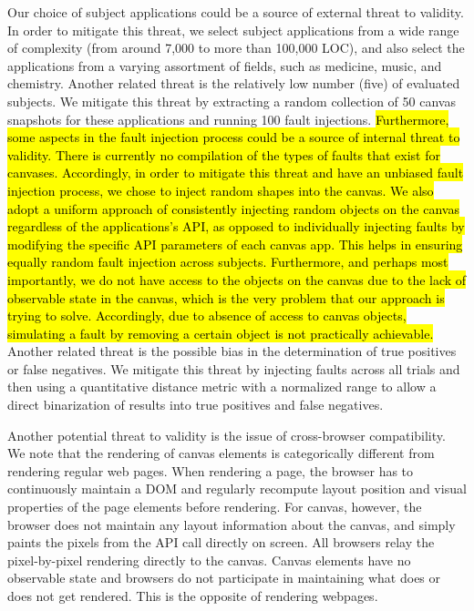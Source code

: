 Our choice of subject applications could be a source of external threat to validity. In order to mitigate this threat, we select subject applications from a wide range of complexity (from around 7,000 to more than 100,000 LOC), and also select the applications from a varying assortment of fields, such as medicine, music, and chemistry. Another related threat is the relatively low number (five) of evaluated subjects. We mitigate this threat by extracting a random collection of 50 canvas snapshots for these applications and running 100 fault injections. \hl{Furthermore, some aspects in the fault injection process could be a source of internal threat to validity. There is currently no compilation of the types of faults that exist for canvases. Accordingly, 
in order to mitigate this threat and have an unbiased fault injection process, we chose to inject random shapes into the canvas. 
We also adopt a uniform approach of consistently injecting random objects on the canvas regardless of the applications's API, as opposed to individually injecting faults by modifying the specific API parameters of each canvas app. This helps in ensuring equally random fault injection across subjects. 
Furthermore, and perhaps most importantly, we do not have access to the objects on the canvas due to the lack of observable state in the canvas, which is the very problem that our approach is trying to solve. Accordingly, due to absence of access to canvas objects, simulating a fault by removing a certain object is not practically achievable.} Another related threat is the possible bias in the determination of true positives or false negatives. We mitigate this threat by injecting faults across all trials and then using a quantitative distance metric with a normalized range to allow a direct binarization of results into true positives and false negatives. 

Another potential threat to validity is the issue of cross-browser compatibility. We note that the rendering of canvas elements is categorically different from rendering regular web pages. When rendering a page, the browser has to continuously maintain a DOM and regularly recompute layout position and visual properties of the page elements before rendering. For canvas, however, the browser does not maintain any layout information about the canvas, and simply paints the pixels from the API call directly on screen. All browsers relay the pixel-by-pixel rendering directly to the canvas. Canvas elements have no observable state and browsers do not participate in maintaining what does or does not get rendered. This is the opposite of rendering webpages.


